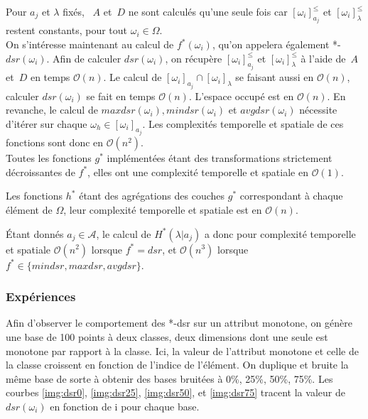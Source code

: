 \documentclass[a4paper]{article}
\begin{document}
Pour $a_j$ et $\lambda$ fixés, ~$A$ et~$D$ ne sont calculés qu'une seule fois car
$[\omega_i]^{\leq}_{a_j}$ et $[\omega_i]^{\leq}_{\lambda}$ restent constants,
pour tout $\omega_i \in \Omega$. \\

On s'intéresse maintenant au calcul de $f^*(\omega_i)$, qu'on appelera également
*-$dsr(\omega_i)$.
Afin de calculer $dsr(\omega_i)$, on récupère $[\omega_i]^{\leq}_{a_j}$ et
$[\omega_i]^{\leq}_{\lambda}$ à l'aide de~$A$ et~$D$ en temps $\mathcal{O}(n)$. Le calcul de
$[\omega_i]_{a_j} \cap [\omega_i]_{\lambda}$ se faisant aussi en $\mathcal{O}(n)$,
calculer $dsr(\omega_i)$ se fait en temps $\mathcal{O}(n)$. L'espace occupé est
en $\mathcal{O}(n)$.
En revanche, le calcul de $maxdsr(\omega_i), mindsr(\omega_i)$ et
$avgdsr(\omega_i)$ nécessite d'itérer sur chaque $\omega_h \in
[\omega_i]_{a_j}$. Les complexités temporelle et spatiale de ces fonctions sont
donc en $\mathcal{O}(n^2)$. \\

Toutes les fonctions $g^*$ implémentées étant des transformations strictement
décroissantes de $f^*$, elles ont une complexité temporelle et spatiale en
$\mathcal{O}(1)$. 

Les fonctions $h^*$ étant des agrégations des couches $g^*$ correspondant à
chaque élément de $\Omega$, leur complexité
temporelle et spatiale est en $\mathcal{O}(n)$.

Étant donnés $a_j \in \mathcal{A}$, le calcul de $H^*(\lambda|a_j)$ a donc pour
complexité temporelle et spatiale $\mathcal{O}(n^2)$ lorsque $f^* = dsr$, et
$\mathcal{O}(n^3)$ lorsque $f^* \in \{mindsr, maxdsr, avgdsr\}$.

\subsubsection{Expériences}

Afin d'observer le comportement des *-dsr sur un attribut monotone, on génère
une base de 100 points à deux classes, deux dimensions dont une seule est
monotone par rapport à la classe.  Ici, la valeur de l'attribut monotone et
celle de la classe croissent en fonction de l'indice de l'élément. On duplique
et bruite la même base de sorte à obtenir des bases bruitées à 0\%, 25\%, 50\%,
75\%.  Les courbes \ref{img:dsr0}, \ref{img:dsr25}, \ref{img:dsr50}, et
\ref{img:dsr75} tracent la valeur de $dsr(\omega_i)$ en fonction de i pour
chaque base. \\
\end{document}
